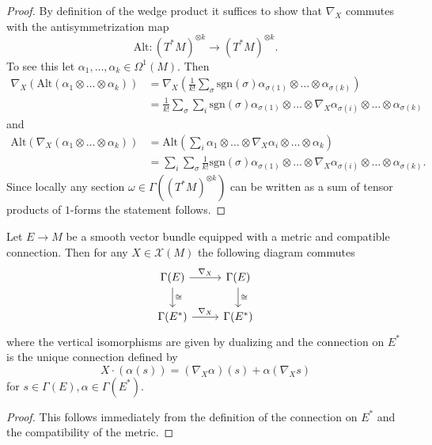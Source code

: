\begin{proof}
    By definition of the wedge product it suffices to show that $\nabla_X$ commutes with the antisymmetrization map 
    \[
    \mathrm{Alt} \colon (T^\ast M)^{\otimes k} \to (T^\ast M)^{\otimes k}.
    \]
    To see this let $\alpha_1,\ldots,\alpha_k \in \Omega^1(M)$. Then 
    \begin{align*}
        \nabla_X (\mathrm{Alt}(\alpha_1\otimes\ldots\otimes\alpha_k)) &= \nabla_X\left(\frac{1}{k!}\sum_{\sigma} \mathrm{sgn}(\sigma) \alpha_{\sigma(1)} \otimes \ldots \otimes \alpha_{\sigma(k)}\right) \\
        &= \frac{1}{k!}\sum_{\sigma}\sum_{i}\mathrm{sgn}(\sigma) \alpha_{\sigma(1)} \otimes \ldots \otimes \nabla_X\alpha_{\sigma(i)}\otimes \ldots \otimes \alpha_{\sigma(k)}
    \end{align*}
    and 
    \begin{align*}
        \mathrm{Alt}(\nabla_X (\alpha_1\otimes\ldots\otimes\alpha_k)) &= \mathrm{Alt}\left(\sum_i \alpha_1 \otimes \ldots \otimes \nabla_X\alpha_i \otimes \ldots \otimes \alpha_k\right) \\
        &= \sum_{i}\sum_{\sigma}\frac{1}{k!}\mathrm{sgn}(\sigma) \alpha_{\sigma(1)} \otimes \ldots \otimes \nabla_X\alpha_{\sigma(i)}\otimes \ldots \otimes \alpha_{\sigma(k)}.
    \end{align*}
    Since locally any section $\omega \in \Gamma((T^\ast M)^{\otimes k})$ can be written as a sum of tensor products of $1$-forms the statement follows.
\end{proof}

\begin{lemma}
    Let $E \to M$ be a smooth vector bundle equipped with a metric and compatible connection. Then for any $X \in \mathscr{X}(M)$ the following diagram commutes 
    \[\begin{tikzcd}
	{\Gamma(E)} & {\Gamma(E)} \\
	{\Gamma(E^\ast)} & {\Gamma(E^\ast)}
	\arrow["{\nabla_X}", from=1-1, to=1-2]
	\arrow["\cong", from=1-1, to=2-1]
	\arrow["\cong", from=1-2, to=2-2]
	\arrow["{\nabla_X}", from=2-1, to=2-2]
\end{tikzcd}\]
where the vertical isomorphisms are given by dualizing and the connection on $E^\ast$ is the unique connection defined by
\[
X\cdot (\alpha(s)) = (\nabla_X\alpha)(s) + \alpha(\nabla_Xs)
\] 
for $s \in \Gamma(E), \alpha \in \Gamma(E^\ast)$.
\end{lemma}
\begin{proof}
    This follows immediately from the definition of the connection on $E^\ast$ and the compatibility of the metric.
\end{proof}
